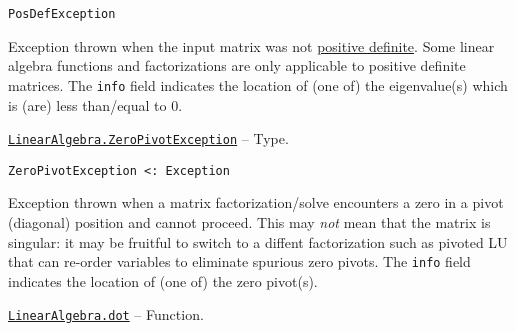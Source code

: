 \begin{adjustwidth}{2em}{0pt}


\begin{verbatim}
PosDefException
\end{verbatim}

Exception thrown when the input matrix was not \href{https://en.wikipedia.org/wiki/Definiteness\_of\_a\_matrix}{positive definite}. Some linear algebra functions and factorizations are only applicable to positive definite matrices. The \texttt{info} field indicates the location of (one of) the eigenvalue(s) which is (are) less than/equal to 0.



\end{adjustwidth}
\hypertarget{5527602249593606173}{} 
\hyperlink{5527602249593606173}{\texttt{LinearAlgebra.ZeroPivotException}}  -- {Type.}

\begin{adjustwidth}{2em}{0pt}


\begin{verbatim}
ZeroPivotException <: Exception
\end{verbatim}

Exception thrown when a matrix factorization/solve encounters a zero in a pivot (diagonal) position and cannot proceed.  This may \emph{not} mean that the matrix is singular: it may be fruitful to switch to a diffent factorization such as pivoted LU that can re-order variables to eliminate spurious zero pivots. The \texttt{info} field indicates the location of (one of) the zero pivot(s).



\end{adjustwidth}
\hypertarget{15449777733236645501}{} 
\hyperlink{15449777733236645501}{\texttt{LinearAlgebra.dot}}  -- {Function.}


